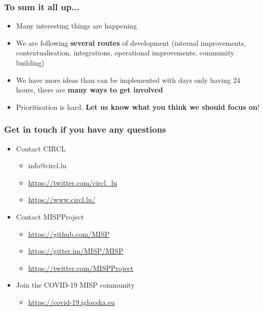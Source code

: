 \begin{frame}
  \frametitle{To sum it all up...}
  \begin{itemize}
     \item Many interesting things are happening
     \item We are following {\bf several routes} of development (internal improvements, contextualisation, integrations, operational improvements, community building)
     \item We have more ideas than can be implemented with days only having 24 hours, there are {\bf many ways to get involved}
     \item Prioritisation is hard. {\bf Let us know what you think we should focus on}!
  \end{itemize}
\end{frame}

\begin{frame}
  \frametitle{Get in touch if you have any questions}
  \begin{itemize}
    \item Contact CIRCL
    \begin{itemize}
      \item info@circl.lu
      \item \url{https://twitter.com/circl_lu}
      \item \url{https://www.circl.lu/}
    \end{itemize}
    \item Contact MISPProject 
    \begin{itemize}
      \item \url{https://github.com/MISP}
      \item \url{https://gitter.im/MISP/MISP}
      \item \url{https://twitter.com/MISPProject}
    \end{itemize}
    \item Join the COVID-19 MISP community
    \begin{itemize}
      \item \url{https://covid-19.iglocska.eu}
    \end{itemize}
  \end{itemize}
\end{frame}
